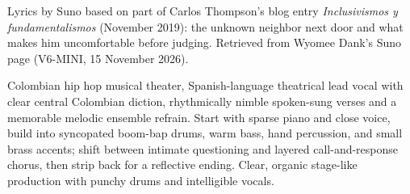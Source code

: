 
\begin{notes}
Lyrics by Suno based on part of Carlos Thompson's blog entry \emph{Inclusivismos y fundamentalismos} (November 2019): the unknown neighbor next door and what makes him uncomfortable before judging. Retrieved from Wyomee Dank's Suno page (V6-MINI, 15 November 2026).
\end{notes}
\begin{style}
Colombian hip hop musical theater, Spanish-language theatrical lead vocal with clear central Colombian diction, rhythmically nimble spoken-sung verses and a memorable melodic ensemble refrain. Start with sparse piano and close voice, build into syncopated boom-bap drums, warm bass, hand percussion, and small brass accents; shift between intimate questioning and layered call-and-response chorus, then strip back for a reflective ending. Clear, organic stage-like production with punchy drums and intelligible vocals.
\end{style}
